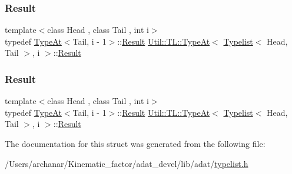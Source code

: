\subsubsection{\texorpdfstring{Result}{Result}\hspace{0.1cm}{\footnotesize\ttfamily [1/2]}}
{\footnotesize\ttfamily template$<$class Head , class Tail , int i$>$ \\
typedef \mbox{\hyperlink{structUtil_1_1TL_1_1TypeAt}{Type\+At}}$<$Tail, i -\/ 1$>$\+::\mbox{\hyperlink{structUtil_1_1TL_1_1TypeAt_3_01Typelist_3_01Head_00_01Tail_01_4_00_01i_01_4_a7ab37564c4bf2d9cfb10c84967788c5c}{Result}} \mbox{\hyperlink{structUtil_1_1TL_1_1TypeAt}{Util\+::\+T\+L\+::\+Type\+At}}$<$ \mbox{\hyperlink{structUtil_1_1Typelist}{Typelist}}$<$ Head, Tail $>$, i $>$\+::\mbox{\hyperlink{structUtil_1_1TL_1_1TypeAt_3_01Typelist_3_01Head_00_01Tail_01_4_00_01i_01_4_a7ab37564c4bf2d9cfb10c84967788c5c}{Result}}}

\mbox{\label{structUtil_1_1TL_1_1TypeAt_3_01Typelist_3_01Head_00_01Tail_01_4_00_01i_01_4_a7ab37564c4bf2d9cfb10c84967788c5c}} 
\subsubsection{\texorpdfstring{Result}{Result}\hspace{0.1cm}{\footnotesize\ttfamily [2/2]}}
{\footnotesize\ttfamily template$<$class Head , class Tail , int i$>$ \\
typedef \mbox{\hyperlink{structUtil_1_1TL_1_1TypeAt}{Type\+At}}$<$Tail, i -\/ 1$>$\+::\mbox{\hyperlink{structUtil_1_1TL_1_1TypeAt_3_01Typelist_3_01Head_00_01Tail_01_4_00_01i_01_4_a7ab37564c4bf2d9cfb10c84967788c5c}{Result}} \mbox{\hyperlink{structUtil_1_1TL_1_1TypeAt}{Util\+::\+T\+L\+::\+Type\+At}}$<$ \mbox{\hyperlink{structUtil_1_1Typelist}{Typelist}}$<$ Head, Tail $>$, i $>$\+::\mbox{\hyperlink{structUtil_1_1TL_1_1TypeAt_3_01Typelist_3_01Head_00_01Tail_01_4_00_01i_01_4_a7ab37564c4bf2d9cfb10c84967788c5c}{Result}}}



The documentation for this struct was generated from the following file\+:\begin{DoxyCompactItemize}
\item 
/\+Users/archanar/\+Kinematic\+\_\+factor/adat\+\_\+devel/lib/adat/\mbox{\hyperlink{lib_2adat_2typelist_8h}{typelist.\+h}}\end{DoxyCompactItemize}
